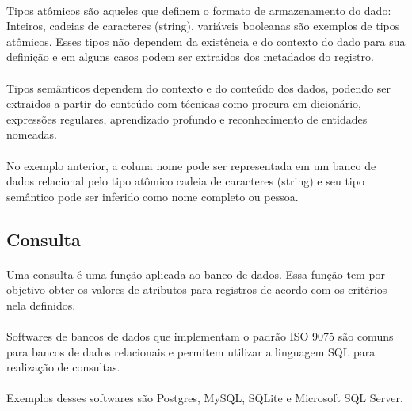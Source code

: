 \paragraph{} Tipos atômicos são aqueles que definem o formato de armazenamento do dado: Inteiros, cadeias de caracteres (string), variáveis booleanas são exemplos de tipos atômicos. Esses tipos não dependem da existência e do contexto do dado para sua definição e em alguns casos podem ser extraidos dos metadados do registro.

\paragraph{} Tipos semânticos dependem do contexto e do conteúdo dos dados, podendo ser extraidos a partir do conteúdo com técnicas como procura em dicionário, expressões regulares, aprendizado profundo\cite{hulsebos2019sherlock} e reconhecimento de entidades nomeadas.

\paragraph{} No exemplo anterior, a coluna nome pode ser representada em um banco de dados relacional pelo tipo atômico cadeia de caracteres (string) e seu tipo semântico pode ser inferido como nome completo ou pessoa.


\subsection{Consulta}

\paragraph{} Uma consulta é uma função aplicada ao banco de dados. Essa função tem por objetivo obter os valores de atributos para registros de acordo com os critérios nela definidos.

\paragraph{} Softwares de bancos de dados que implementam o padrão ISO 9075 são comuns para bancos de dados relacionais e permitem utilizar a linguagem SQL para realização de consultas.

\paragraph{} Exemplos desses softwares são Postgres, MySQL, SQLite e Microsoft SQL Server.

